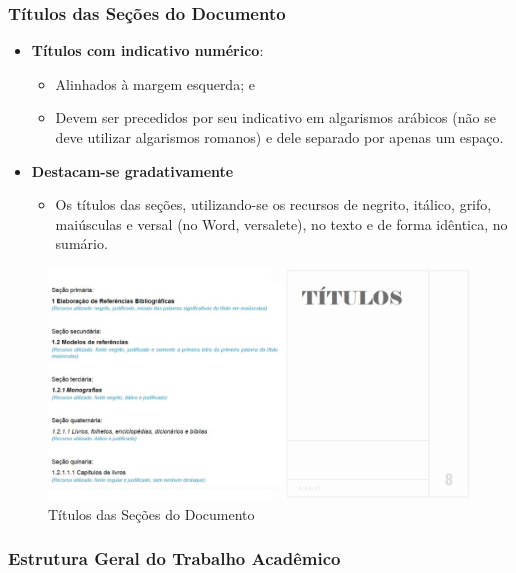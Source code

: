 \documentclass[
]{book}
\providecommand{\tightlist}{%
  \setlength{\itemsep}{0pt}\setlength{\parskip}{0pt}}
\begin{document}
\hypertarget{tuxedtulos-das-seuxe7uxf5es-do-documento}{%
\subsubsection{Títulos das Seções do Documento}\label{tuxedtulos-das-seuxe7uxf5es-do-documento}}

\begin{itemize}
\tightlist
\item
  \textbf{Títulos com indicativo numérico}:

  \begin{itemize}
  \tightlist
  \item
    Alinhados à margem esquerda; e
  \item
    Devem ser precedidos por seu indicativo em algarismos arábicos (não se deve utilizar algarismos romanos) e dele separado por apenas um espaço.
  \end{itemize}
\item
  \textbf{Destacam-se gradativamente}

  \begin{itemize}
  \tightlist
  \item
    Os títulos das seções, utilizando-se os recursos de negrito, itálico, grifo, maiúsculas e versal (no Word, versalete), no texto e de forma idêntica, no sumário.
  \end{itemize}
\end{itemize}

\begin{figure}

{\centering \includegraphics[width=0.8\linewidth]{imagens/titulos-secoes-documentos} 

}

\caption{Títulos das Seções do Documento}\label{fig:unnamed-chunk-17}
\end{figure}

\hypertarget{estrutura-geral-do-trabalho-acaduxeamico}{%
\subsubsection{Estrutura Geral do Trabalho Acadêmico}\label{estrutura-geral-do-trabalho-acaduxeamico}}
\end{document}
